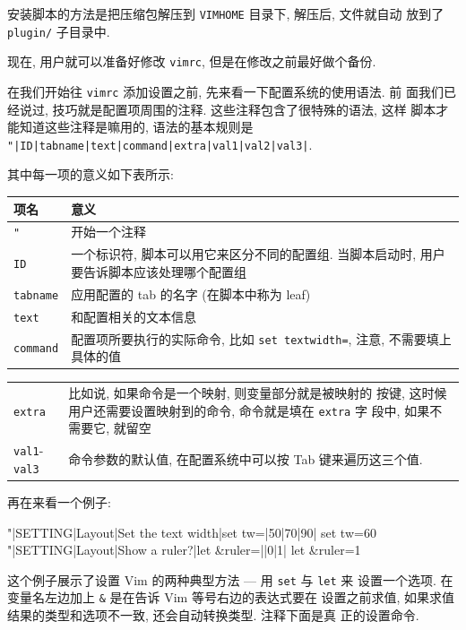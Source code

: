 安装脚本的方法是把压缩包解压到 \texttt{VIMHOME} 目录下, 解压后, 文件就自动
放到了 \texttt{plugin/} 子目录中.

现在, 用户就可以准备好修改 \texttt{vimrc}, 但是在修改之前最好做个备份.

在我们开始往 \texttt{vimrc} 添加设置之前, 先来看一下配置系统的使用语法. 前
面我们已经说过, 技巧就是配置项周围的注释. 这些注释包含了很特殊的语法, 这样
脚本才能知道这些注释是嘛用的, 语法的基本规则是
\texttt{"|ID|tabname|text|command|extra|val1|val2|val3|}.

其中每一项的意义如下表所示:
\begin{center}
  \begin{tabular}{ll}
  \hline
  项名 & 意义 \\
  \hline
   \texttt{"}	& 开始一个注释 \\
   \texttt{ID}	& 一个标识符, 脚本可以用它来区分不同的配置组. 当脚本启动时,
     用户要告诉脚本应该处理哪个配置组 \\
   \texttt{tabname} & 应用配置的 tab 的名字 (在脚本中称为 leaf) \\
   \texttt{text} & 和配置相关的文本信息 \\
   \texttt{command} & 配置项所要执行的实际命令, 比如 \texttt{set textwidth=},
     注意, 不需要填上具体的值 \\
	\hline
  \end{tabular}
\end{center}
\begin{center}
	\begin{tabular}{ll}
	  \texttt{extra} & 比如说, 如果命令是一个映射, 则变量部分就是被映射的
	  按键, 这时候用户还需要设置映射到的命令, 命令就是填在 \texttt{extra} 字
	  段中, 如果不需要它, 就留空 \\

	  \texttt{val1}-\texttt{val3} & 命令参数的默认值, 在配置系统中可以按
	  Tab 键来遍历这三个值.
	\end{tabular}
\end{center}

再在来看一个例子:
\begin{vimcode}
"|SETTING|Layout|Set the text width|set tw=|50|70|90|
set tw=60
"|SETTING|Layout|Show a ruler?|let &ruler=||0|1|
let &ruler=1
\end{vimcode}
这个例子展示了设置 Vim 的两种典型方法 --- 用 \texttt{set} 与 \texttt{let} 来
设置一个选项. 在变量名左边加上 \texttt{\&} 是在告诉 Vim 等号右边的表达式要在
设置之前求值, 如果求值结果的类型和选项不一致, 还会自动转换类型. 注释下面是真
正的设置命令.

